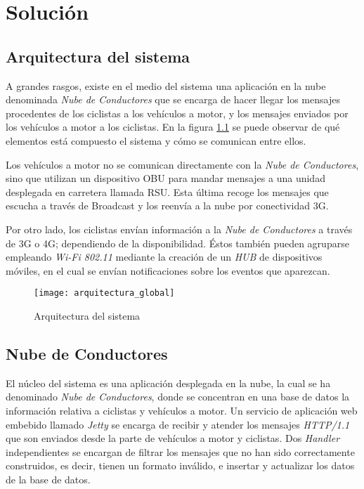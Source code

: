 \chapter{Solución}\label{cha:solucion}

\section{Arquitectura del sistema}\label{section:arquitecturaSistema}
A grandes rasgos, existe en el medio del sistema una aplicación en la nube denominada \emph{Nube de Conductores} que se encarga de hacer llegar los mensajes procedentes de los ciclistas a los vehículos a motor, y los mensajes enviados por los vehículos a motor a los ciclistas. En la figura \ref{fig:ArquitecturaSistema} se puede observar de qué elementos está compuesto el sistema y cómo se comunican entre ellos.

Los vehículos a motor no se comunican directamente con la \emph{Nube de Conductores}, sino que utilizan un dispositivo OBU para mandar mensajes a una unidad desplegada en carretera llamada RSU. Esta última recoge los mensajes que escucha a través de Broadcast y los reenvía a la nube por conectividad 3G.

Por otro lado, los ciclistas envían información a la \emph{Nube de Conductores} a través de 3G o 4G; dependiendo de la disponibilidad. \'Estos también pueden agruparse empleando \emph{Wi-Fi 802.11} mediante la creación de un \emph{HUB} de dispositivos móviles, en el cual se envían notificaciones sobre los eventos que aparezcan.

\begin{figure}[h]
	\begin{center}
		\texttt{[image: arquitectura\_global]}
		\caption{Arquitectura del sistema}
		\label{fig:ArquitecturaSistema}
	 \end{center}
\end{figure}

\section{Nube de Conductores}\label{section:NubeConductores}
El núcleo del sistema es una aplicación desplegada en la nube, la cual se ha denominado \emph{Nube de Conductores}, donde se concentran en una base de datos la información relativa a ciclistas y vehículos a motor. Un servicio de aplicación web embebido llamado \emph{Jetty} se encarga de recibir y atender los mensajes \emph{HTTP/1.1} que son enviados desde la parte de vehículos a motor y ciclistas. Dos \emph{Handler} independientes se encargan de filtrar los mensajes que no han sido correctamente construidos, es decir, tienen un formato inválido, e insertar y actualizar los datos de la base de datos.

